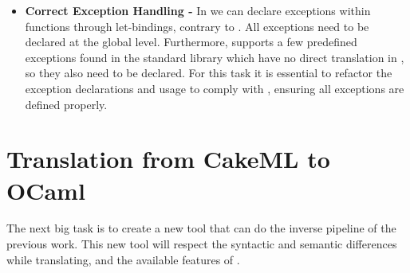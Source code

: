 \begin{itemize}
\item \textbf{Correct Exception Handling -} In \ocaml we can declare exceptions within functions through let-bindings, contrary to
\cml. All exceptions need to be 
declared at the global level. Furthermore, \ocaml supports a few predefined exceptions found in the standard library which have no 
direct translation in \cml, so they also need to be declared. For this task it is essential to refactor the exception declarations 
and usage to comply with \cml, ensuring all exceptions are defined properly.

\end{itemize}

\section{Translation from CakeML to OCaml}

The next big task is to create a new tool that can do the inverse pipeline of the previous work. This new tool will respect
the syntactic and semantic differences while translating, and the available features of \cml.

